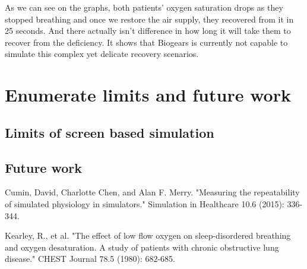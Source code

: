 \documentclass[a4paper]{article}
\begin{document}
As we can see on the graphs, both patients' oxygen saturation drops as they stopped breathing and once we restore the air supply, they recovered from it in 25 seconds. And there actually isn't difference in how long it will take them to recover from the deficiency. It shows that Biogears is currently not capable to simulate this complex yet delicate recovery scenarios.


\section{Enumerate limits and future work}
\subsection{Limits of screen based simulation}
\subsection{Future work}

\begin{thebibliography}{1}

   Cumin, David, Charlotte Chen, and Alan F. Merry. "Measuring the repeatability of simulated physiology in simulators." Simulation in Healthcare 10.6 (2015): 336-344.

  Kearley, R., et al. "The effect of low flow oxygen on sleep-disordered breathing and oxygen desaturation. A study of patients with chronic obstructive lung disease." CHEST Journal 78.5 (1980): 682-685.  



  \end{thebibliography}
\end{document}
